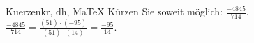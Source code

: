 \begin{MAufgabe}{Kuerzen}{kr, dh, MaTeX}
K\"urzen Sie soweit m\"oglich: $\frac{-4845}{714}$.\\ 
\ifLsg\MLoesung
\quad $\frac{-4845}{714}=\frac{(51)\cdot(-95)}{(51)\cdot(14)}=\frac{-95}{14}$.\else\relax\fi
 \end{MAufgabe}